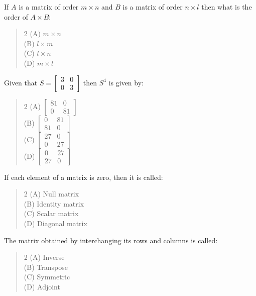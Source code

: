 \documentclass[11pt,a4paper]{article}
\begin{document}
\begin{mcqlist}
\item If $A$ is a matrix of order $m\times n$ and $B$ is a matrix of order $n\times l$ then what is the order of $A\times B$:
\begin{quote}\begin{multicols}{2}
\noindent (A) $m\times n$ \\
(B) $l\times m$ \\
(C) $l\times n$ \\
(D) $m\times l$
\end{multicols}\end{quote}

\item Given that $S=\begin{bmatrix}3&0\\0&3\end{bmatrix}$ then $S^4$ is given by:
\begin{quote}\begin{multicols}{2}
\noindent (A) $\begin{bmatrix}81&0\\0&81\end{bmatrix}$ \\
(B) $\begin{bmatrix}0&81\\81&0\end{bmatrix}$ \\
(C) $\begin{bmatrix}27&0\\0&27\end{bmatrix}$ \\
(D) $\begin{bmatrix}0&27\\27&0\end{bmatrix}$
\end{multicols}\end{quote}

\item If each element of a matrix is zero, then it is called:
\begin{quote}\begin{multicols}{2}
\noindent (A) Null matrix \\
(B) Identity matrix \\
(C) Scalar matrix \\
(D) Diagonal matrix
\end{multicols}\end{quote}

\item The matrix obtained by interchanging its rows and columns is called:
\begin{quote}\begin{multicols}{2}
\noindent (A) Inverse \\
(B) Transpose \\
(C) Symmetric \\
(D) Adjoint
\end{multicols}\end{quote}


\end{mcqlist}
\end{document}
